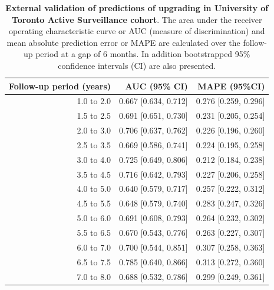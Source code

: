 \begin{subappendices}
\begin{table}
\small
\centering
\caption{\textbf{External validation of predictions of upgrading in University of Toronto Active Surveillance cohort}. The area under the receiver operating characteristic curve or AUC (measure of discrimination) and mean absolute prediction error or MAPE are calculated over the follow-up period at a gap of 6 months. In addition bootstrapped 95\% confidence intervals (CI) are also presented.}
\label{c5:tab:AUC_PE_Toronto}
\begin{tabular}{r|r|r}
\hline
\hline
Follow-up period (years) & AUC (95\% CI) & MAPE (95\%CI)\\ 
\hline
1.0 to 2.0 & 0.667 [0.634, 0.712] & 0.276 [0.259, 0.296]\\
1.5 to 2.5 & 0.691 [0.651, 0.730] & 0.231 [0.205, 0.254]\\
2.0 to 3.0 & 0.706 [0.637, 0.762] & 0.226 [0.196, 0.260]\\
2.5 to 3.5 & 0.669 [0.586, 0.741] & 0.224 [0.195, 0.258]\\
3.0 to 4.0 & 0.725 [0.649, 0.806] & 0.212 [0.184, 0.238]\\
3.5 to 4.5 & 0.716 [0.642, 0.793] & 0.227 [0.206, 0.258]\\
4.0 to 5.0 & 0.640 [0.579, 0.717] & 0.257 [0.222, 0.312]\\
4.5 to 5.5 & 0.648 [0.579, 0.740] & 0.283 [0.247, 0.326]\\
5.0 to 6.0 & 0.691 [0.608, 0.793] & 0.264 [0.232, 0.302]\\
5.5 to 6.5 & 0.670 [0.543, 0.776] & 0.263 [0.227, 0.307]\\
6.0 to 7.0 & 0.700 [0.544, 0.851] & 0.307 [0.258, 0.363]\\
6.5 to 7.5 & 0.785 [0.640, 0.866] & 0.313 [0.272, 0.360]\\
7.0 to 8.0 & 0.688 [0.532, 0.786] & 0.299 [0.249, 0.361]\\
\hline
\end{tabular}    
\end{table}


\end{subappendices}
